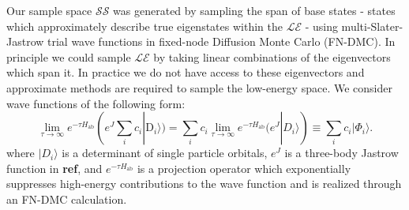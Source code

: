 \documentclass{article}
\begin{document}
Our sample space $\mathcal{SS}$ was generated by sampling the span of base states - states which approximately describe true eigenstates within the $\mathcal{LE}$ - using multi-Slater-Jastrow trial wave functions in fixed-node Diffusion Monte Carlo (FN-DMC). In principle we could sample $\mathcal{LE}$ by taking linear combinations of the eigenvectors which span it. In practice we do not have access to these eigenvectors and approximate methods are required to sample the low-energy space. We consider wave functions of the following form: 
\begin{equation}
\lim_{\tau \rightarrow \infty} e^{-\tau H_\text{ab}} (e^{J}\sum_{i} c_i|\text{D}_i\rangle) = \sum_i c_i \lim_{\tau \rightarrow \infty} e^{-\tau H_\text{ab}} (e^J |D_i\rangle) \equiv \sum_i c_i |\Phi_i\rangle .
\end{equation}
where $|D_i\rangle$ is a determinant of single particle orbitals, $e^J$ is a three-body Jastrow function in \textbf{ref}, and $e^{-\tau H_\text{ab}}$ is a projection operator which exponentially suppresses high-energy contributions to the wave function and is realized through an FN-DMC calculation.
\end{document}
